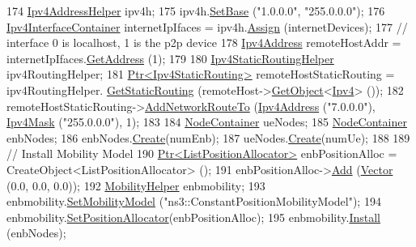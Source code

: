 \begin{DoxyCode}
174   \hyperlink{classns3_1_1Ipv4AddressHelper}{Ipv4AddressHelper} ipv4h;
175   ipv4h.\hyperlink{classns3_1_1Ipv4AddressHelper_acf7b16dd25bac67e00f5e25f90a9a035}{SetBase} (\textcolor{stringliteral}{"1.0.0.0"}, \textcolor{stringliteral}{"255.0.0.0"});
176   \hyperlink{classns3_1_1Ipv4InterfaceContainer}{Ipv4InterfaceContainer} internetIpIfaces = ipv4h.\hyperlink{classns3_1_1Ipv4AddressHelper_af8e7f4a1a7e74c00014a1eac445a27af}{Assign} (internetDevices);
177   \textcolor{comment}{// interface 0 is localhost, 1 is the p2p device}
178   \hyperlink{classns3_1_1Ipv4Address}{Ipv4Address} remoteHostAddr = internetIpIfaces.\hyperlink{classns3_1_1Ipv4InterfaceContainer_ae63208dcd222be986822937ee4aa828c}{GetAddress} (1);
179 
180   \hyperlink{classns3_1_1Ipv4StaticRoutingHelper}{Ipv4StaticRoutingHelper} ipv4RoutingHelper;
181   \hyperlink{classns3_1_1Ptr}{Ptr<Ipv4StaticRouting>} remoteHostStaticRouting = ipv4RoutingHelper.
      \hyperlink{classns3_1_1Ipv4StaticRoutingHelper_a731206e50d305695dac7fb2ef963a4bb}{GetStaticRouting} (remoteHost->\hyperlink{classns3_1_1Object_a13e18c00017096c8381eb651d5bd0783}{GetObject}<\hyperlink{classns3_1_1Ipv4}{Ipv4}> ());
182   remoteHostStaticRouting->\hyperlink{classns3_1_1Ipv4StaticRouting_a8bf5eaa7ba49fe33c78c70d5560b6c39}{AddNetworkRouteTo} (\hyperlink{classns3_1_1Ipv4Address}{Ipv4Address} (\textcolor{stringliteral}{"7.0.0.0"}), 
      \hyperlink{classns3_1_1Ipv4Mask}{Ipv4Mask} (\textcolor{stringliteral}{"255.0.0.0"}), 1);
183 
184   \hyperlink{classns3_1_1NodeContainer}{NodeContainer} ueNodes;
185   \hyperlink{classns3_1_1NodeContainer}{NodeContainer} enbNodes;
186   enbNodes.\hyperlink{classns3_1_1NodeContainer_a787f059e2813e8b951cc6914d11dfe69}{Create}(numEnb);
187   ueNodes.\hyperlink{classns3_1_1NodeContainer_a787f059e2813e8b951cc6914d11dfe69}{Create}(numUe);
188 
189   \textcolor{comment}{// Install Mobility Model}
190   \hyperlink{classns3_1_1Ptr}{Ptr<ListPositionAllocator>} enbPositionAlloc = 
      CreateObject<ListPositionAllocator> ();
191   enbPositionAlloc->\hyperlink{classns3_1_1ListPositionAllocator_a460e82f015ac012a73ba0ea0cccb3486}{Add} (\hyperlink{classns3_1_1Vector3D_a7e59b47bc94c9cb1dadff68c1d0112d8}{Vector} (0.0, 0.0, 0.0));
192   \hyperlink{classns3_1_1MobilityHelper}{MobilityHelper} enbmobility;
193   enbmobility.\hyperlink{classns3_1_1MobilityHelper_a030275011b6f40682e70534d30280aba}{SetMobilityModel} (\textcolor{stringliteral}{"ns3::ConstantPositionMobilityModel"});
194   enbmobility.\hyperlink{classns3_1_1MobilityHelper_ac59d5295076be3cc11021566713a28c5}{SetPositionAllocator}(enbPositionAlloc);
195   enbmobility.\hyperlink{classns3_1_1MobilityHelper_a07737960ee95c0777109cf2994dd97ae}{Install} (enbNodes);

\end{DoxyCode}
